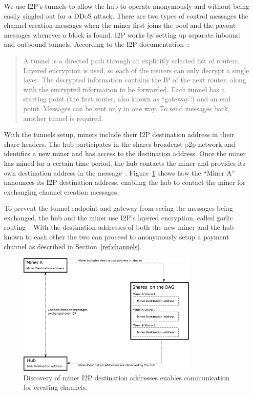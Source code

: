 \documentclass{article}
\begin{document}
We use I2P's tunnels to allow the hub to operate anonymously and
without being easily singled out for a DDoS attack. There are two
types of control messages the channel creation messages when the miner
first joins the pool and the payout messages whenever a block is
found. I2P works by setting up separate inbound and outbound
tunnels. According to the I2P documentation~\cite{i2p-tech-intro}:

\begin{quote}
  A tunnel is a directed path through an explicitly selected list of
  routers. Layered encryption is used, so each of the routers can only
  decrypt a single layer. The decrypted information contains the IP of
  the next router, along with the encrypted information to be
  forwarded. Each tunnel has a starting point (the first router, also
  known as ``gateway'') and an end point. Messages can be sent only in
  one way. To send messages back, another tunnel is required.
\end{quote}

With the tunnels setup, miners include their I2P destination address
in their share headers. The hub participates in the shares broadcast
p2p network and identifies a new miner and has access to the
destination address. Once the miner has mined for a certain time
period, the hub contacts the miner and provides its own destination
address in the
message~\cite{i2p-streaming-library}. Figure~\ref{fig:new-miner-communication}
shows how the ``Miner A'' announces its I2P destination address,
enabling the hub to contact the miner for exchanging channel creation
messages.

To prevent the tunnel endpoint and gateway from seeing the messages
being exchanged, the hub and the miner use I2P's layered encryption,
called garlic routing~\cite{i2p-garlic-routing}. With the destination
addresses of both the new miner and the hub known to each other the
two can proceed to anonymously setup a payment channel as described in
Section~\ref{ref:channels}.

\begin{figure}
  \begin{center}
    \includegraphics[width=0.8\textwidth]{new-miner-communication.eps}
    \caption{Discovery of miner I2P destination addresses enables
      communication for creating channels.}\label{fig:new-miner-communication}
  \end{center}
\end{figure}
\end{document}

